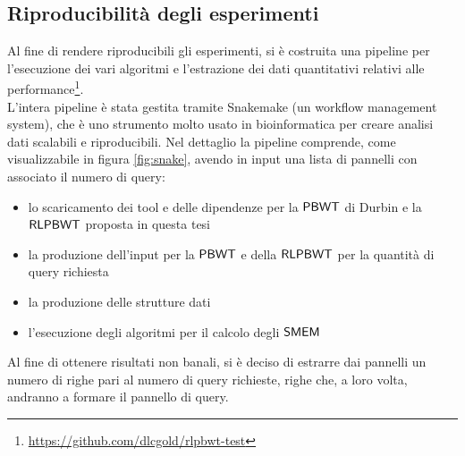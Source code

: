 \subsection{Riproducibilità degli esperimenti}
Al fine di rendere riproducibili gli esperimenti, si è costruita una pipeline
per l'esecuzione dei vari algoritmi e l'estrazione dei dati quantitativi
relativi alle
performance\footnote{\url{https://github.com/dlcgold/rlpbwt-test}}.\\
L'intera pipeline è stata gestita tramite Snakemake \cite{snakemake}
(un workflow management system), che è uno strumento molto usato in
bioinformatica per creare analisi dati scalabili e riproducibili. Nel
dettaglio la pipeline comprende, come visualizzabile in figura \ref{fig:snake},
avendo in input una lista di pannelli con associato il numero di query:
\begin{itemize}
  \item lo scaricamento dei tool e delle dipendenze per la $\mbox{\rm {\sf PBWT}}$ di
  Durbin e la $\mbox{\rm {\sf RLPBWT}}$ proposta in questa tesi
  \item la produzione dell'input per la $\mbox{\rm {\sf PBWT}}$ e della $\mbox{\rm {\sf RLPBWT}}$ per
  la quantità di query richiesta
  \item la produzione delle strutture dati
  \item l'esecuzione degli algoritmi per il calcolo degli $\mbox{\rm {\sf SMEM}}$
\end{itemize}
Al fine di ottenere risultati non banali, si è deciso di estrarre dai pannelli
un numero di
righe pari al numero di 
query richieste, righe che, a loro volta, andranno a formare il pannello di
query.\\
